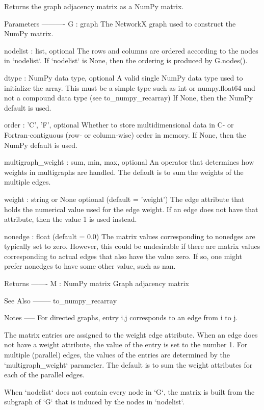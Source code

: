 \begin{DoxyVerb}Returns the graph adjacency matrix as a NumPy matrix.

Parameters
----------
G : graph
    The NetworkX graph used to construct the NumPy matrix.

nodelist : list, optional
    The rows and columns are ordered according to the nodes in `nodelist`.
    If `nodelist` is None, then the ordering is produced by G.nodes().

dtype : NumPy data type, optional
    A valid single NumPy data type used to initialize the array.
    This must be a simple type such as int or numpy.float64 and
    not a compound data type (see to_numpy_recarray)
    If None, then the NumPy default is used.

order : {'C', 'F'}, optional
    Whether to store multidimensional data in C- or Fortran-contiguous
    (row- or column-wise) order in memory. If None, then the NumPy default
    is used.

multigraph_weight : {sum, min, max}, optional
    An operator that determines how weights in multigraphs are handled.
    The default is to sum the weights of the multiple edges.

weight : string or None optional (default = 'weight')
    The edge attribute that holds the numerical value used for
    the edge weight. If an edge does not have that attribute, then the
    value 1 is used instead.

nonedge : float (default = 0.0)
    The matrix values corresponding to nonedges are typically set to zero.
    However, this could be undesirable if there are matrix values
    corresponding to actual edges that also have the value zero. If so,
    one might prefer nonedges to have some other value, such as nan.

Returns
-------
M : NumPy matrix
    Graph adjacency matrix

See Also
--------
to_numpy_recarray

Notes
-----
For directed graphs, entry i,j corresponds to an edge from i to j.

The matrix entries are assigned to the weight edge attribute. When
an edge does not have a weight attribute, the value of the entry is set to
the number 1.  For multiple (parallel) edges, the values of the entries
are determined by the `multigraph_weight` parameter.  The default is to
sum the weight attributes for each of the parallel edges.

When `nodelist` does not contain every node in `G`, the matrix is built
from the subgraph of `G` that is induced by the nodes in `nodelist`.


\end{DoxyVerb}
